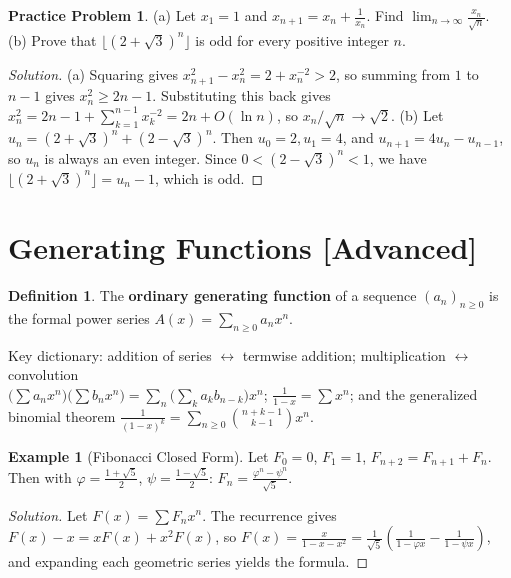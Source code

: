 \documentclass[11pt]{article}
\theoremstyle{plain}
\theoremstyle{definition}
\newtheorem{definition}[theorem]{Definition}
\newtheorem{example}[theorem]{Example}
\newtheorem{problem}[theorem]{Practice Problem}
\newenvironment{solution}{\begin{proof}[Solution]}{\end{proof}}
\begin{document}
\begin{problem}
(a) Let $x_1 = 1$ and $x_{n+1} = x_n + \frac{1}{x_n}$. Find $\lim_{n\to\infty}\frac{x_n}{\sqrt{n}}$.
(b) Prove that $\lfloor (2+\sqrt{3})^n \rfloor$ is odd for every positive integer $n$.
\end{problem}
\begin{solution}
(a) Squaring gives $x_{n+1}^2 - x_n^2 = 2 + x_n^{-2} > 2$, so summing from $1$ to $n-1$ gives $x_n^2 \ge 2n-1$. Substituting this back gives $x_n^2 = 2n-1 + \sum_{k=1}^{n-1}x_k^{-2} = 2n + O(\ln n)$, so $x_n/\sqrt{n} \to \sqrt{2}$.
(b) Let $u_n = (2+\sqrt{3})^n + (2-\sqrt{3})^n$. Then $u_0=2, u_1=4$, and $u_{n+1} = 4u_n - u_{n-1}$, so $u_n$ is always an even integer. Since $0 < (2-\sqrt{3})^n < 1$, we have $\lfloor (2+\sqrt{3})^n \rfloor = u_n - 1$, which is odd.
\end{solution}

\section{Generating Functions [Advanced]}

\begin{definition}
The \textbf{ordinary generating function} of a sequence $(a_n)_{n\ge0}$ is the
formal power series $A(x) = \sum_{n\ge0} a_n x^n$.
\end{definition}

Key dictionary: addition of series $\leftrightarrow$ termwise addition;
multiplication $\leftrightarrow$ convolution \\
$\bigl(\sum a_nx^n\bigr)\bigl(\sum b_nx^n\bigr) = \sum_n \bigl(\sum_{k} a_k b_{n-k}\bigr)x^n$;
$\frac{1}{1-x} = \sum x^n$; and the generalized binomial theorem
$\frac{1}{(1-x)^k} = \sum_{n\ge0}\binom{n+k-1}{k-1}x^n$.

\begin{example}[Fibonacci Closed Form]
Let $F_0=0$, $F_1=1$, $F_{n+2}=F_{n+1}+F_n$. Then with
$\varphi = \frac{1+\sqrt5}{2}$, $\psi = \frac{1-\sqrt5}{2}$:
$F_n = \frac{\varphi^n - \psi^n}{\sqrt5}$.
\end{example}
\begin{solution}
Let $F(x)=\sum F_n x^n$. The recurrence gives
$F(x) - x = x F(x) + x^2 F(x)$, so $F(x) = \frac{x}{1-x-x^2} = \frac{1}{\sqrt5}\left(\frac{1}{1-\varphi x} - \frac{1}{1-\psi x}\right)$,
and expanding each geometric series yields the formula.
\end{solution}
\end{document}
